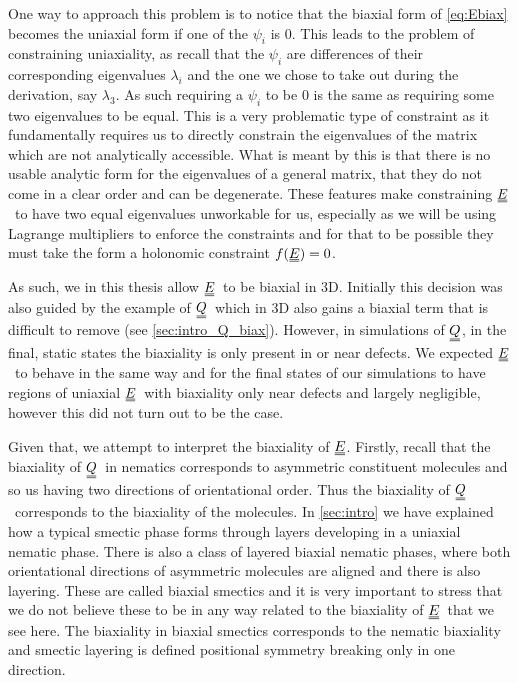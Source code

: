 \documentclass[12pt]{article}
\newcommand{\duf}[2]{\stackunder[0.5pt]{\stackunder[0.8pt]{\stackunder[1pt]{\ensuremath{#1}}{\rule{\widthof{\ensuremath{#2}}*\real{0.9}}{.1ex}}}{\rule{\widthof{\ensuremath{#2}}*\real{0.9}}{.1ex}}}{}}
\newcommand{\du}[1]{\duf{#1}{#1}}
\newcommand{\QQ}{\ensuremath{\du{Q}}}
\newcommand{\EE}{\ensuremath{\du{E}}}
\begin{document}
        One way to approach this problem is to notice that the biaxial form of \cref{eq:Ebiax} becomes the uniaxial form if one of the $\psi_i$ is 0.
        This leads to the problem of constraining uniaxiality, as recall that the $\psi_i$ are differences of their corresponding eigenvalues $\lambda_i$ and the one we chose to take out during the derivation, say $\lambda_3$.
        As such requiring a $\psi_i$ to be 0 is the same as requiring some two eigenvalues to be equal.
        This is a very problematic type of constraint as it fundamentally requires us to directly constrain the eigenvalues of the matrix which are not analytically accessible.
        What is meant by this is that there is no usable analytic form for the eigenvalues of a general matrix, that they do not come in a clear order and can be degenerate.
        These features make constraining \EE\ to have two equal eigenvalues unworkable for us, especially as we will be using Lagrange multipliers to enforce the constraints and for that to be possible they must take the form a holonomic constraint $f(\du{E}) = 0$.

        As such, we in this thesis allow \EE\ to be biaxial in 3D.
        Initially this decision was also guided by the example of \QQ\ which in 3D also gains a biaxial term that is difficult to remove (see \cref{sec:intro_Q_biax}).
        However, in simulations of \QQ, in the final, static states the biaxiality is only present in or near defects.
        We expected \EE\ to behave in the same way and for the final states of our simulations to have regions of uniaxial \EE\ with biaxiality only near defects and largely negligible, however this did not turn out to be the case.

        Given that, we attempt to interpret the biaxiality of \EE.
        Firstly, recall that the biaxiality of \QQ\ in nematics corresponds to asymmetric constituent molecules and so us having two directions of orientational order.
        Thus the biaxiality of \QQ\ corresponds to the biaxiality of the molecules.
        In \cref{sec:intro} we have explained how a typical smectic phase forms through layers developing in a uniaxial nematic phase.
        There is also a class of layered biaxial nematic phases, where both orientational directions of asymmetric molecules are aligned and there is also layering.
        These are called biaxial smectics\cite{k.sadashivaBiaxialSmecticPhase2002,semmlerBiaxialSmecticPhases1998} and it is very important to stress that we do not believe these to be in any way related to the biaxiality of \EE\ that we see here.
        The biaxiality in biaxial smectics corresponds to the nematic biaxiality and smectic layering is defined positional symmetry breaking only in one direction.
\end{document}
